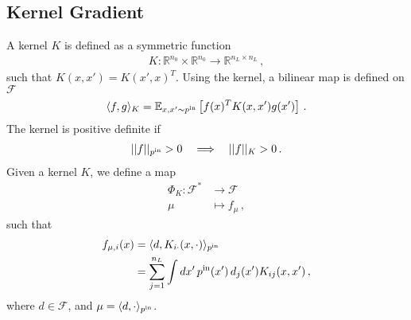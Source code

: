 \documentclass[11pt]{article}
\begin{document}

\subsection{Kernel Gradient}
\label{sec:KernGradDef}

A kernel $K$ is defined as a symmetric function 
\begin{align}
    \label{eq:KernDef}
    K: \mathbb{R}^{n_0} \times \mathbb{R}^{n_0} \to 
    \mathbb{R}^{n_L\times n_L}\, ,
\end{align}
such that $K(x,x')=K(x',x)^T$. Using the kernel, a bilinear map is defined 
on $\mathcal{F}$
\begin{align}
    \label{eq:KMap}
    \langle f,g\rangle_K = \mathbb{E}_{x,x'\sim p^{\text{in}}}
    \left[
        f(x)^T K(x,x') g(x')
    \right]\, .
\end{align}
The kernel is positive definite if
\begin{align}
    ||f||_{p^{\text{in}}} > 0 
    \quad \Longrightarrow \quad
    ||f||_K > 0\, .
\end{align}
Given a kernel $K$, we define a map
\begin{align}
    \label{eq:PhiKMap}
    \Phi_K: \mathcal{F}^* &\to \mathcal{F} \\
            \mu &\mapsto f_{\mu}\, ,
\end{align}
such that 
\begin{align}
    f_{\mu,i}(x) 
        &= \langle d, K_{i\cdot}(x,\cdot) \rangle_{p^{\text{in}}} \\
        &= \sum_{j=1}^{n_L} \int dx'\, p^{\text{in}}(x')\, d_j(x')
            K_{ij}(x,x')\, ,
\end{align}
where $d\in\mathcal{F}$, and $\mu=\langle d, \cdot\rangle_{p^{\text{in}}}$.
\end{document}
